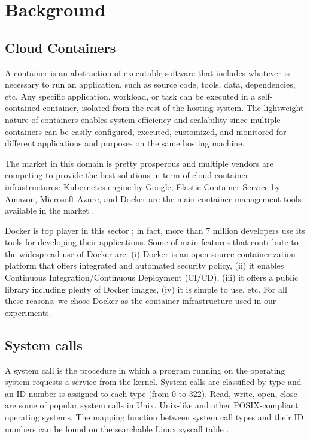 \section{Background}\label{sec:background}

\subsection{Cloud Containers}
A container is an abstraction of executable software that includes whatever is necessary to run an application, such as source code, tools, data, dependencies, etc. Any specific application, workload, or task can be executed in a self-contained container, isolated from the rest of the hosting system. The lightweight nature of containers enables system efficiency and scalability since multiple containers can be easily configured, executed, customized, and monitored for different applications and purposes on the same hosting machine.

The market in this domain is pretty prosperous and multiple vendors are competing to provide the best solutions in term of cloud container infrastructures: Kubernetes engine by Google, Elastic Container Service by Amazon, Microsoft Azure, and Docker are the main container management tools available in the market \cite{bernstein2014containers}.

Docker is top player in this sector \cite{merkel2014docker}; in fact, more than 7 million developers use its tools for developing their applications. Some of main features that contribute to the widespread use of Docker are: (i) Docker is an open source containerization platform that offers integrated and automated security policy, (ii) it enables Continuous Integration/Continuous Deployment (CI/CD), (iii) it offers a public library including plenty of Docker images, (iv) it is simple to use, etc. For all these reasons, we chose Docker as the container infrastructure used in our experiments.

\subsection{System calls}
A system call is the procedure in which a program running on the operating system requests a service from the kernel. System calls are classified by type and an ID number is assigned to each type (from 0 to 322). Read, write, open, close are some of popular system calls in Unix, Unix-like and other POSIX-compliant operating systems. The mapping function between system call types and their ID numbers can be found on the searchable Linux syscall table \cite{syscall-table}.

